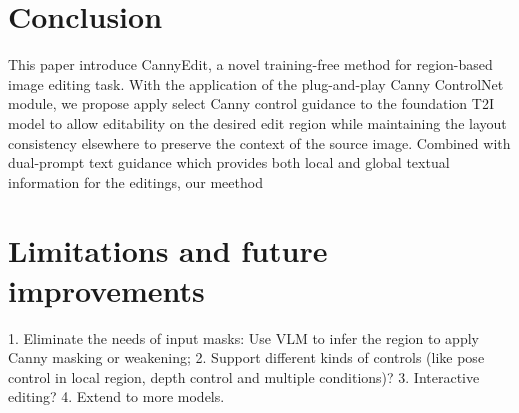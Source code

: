 \documentclass{article}
\begin{document}
\section{Conclusion}

This paper introduce CannyEdit, a novel training-free method for region-based image editing task. With the application of the plug-and-play Canny ControlNet module, we propose apply select Canny control guidance to the foundation T2I model to allow editability on the desired edit region while maintaining the layout consistency elsewhere to preserve the context of the source image. Combined with dual-prompt text guidance which provides both local and global textual information for the editings, our meethod 

\section{Limitations and future improvements}
\label{Sec:limitation}
1. Eliminate the needs of input masks: Use VLM to infer the region to apply Canny masking or weakening;
2. Support different kinds of controls (like pose control in local region, depth control and multiple conditions)? 
3. Interactive editing?
4. Extend to more models.











\end{document}
